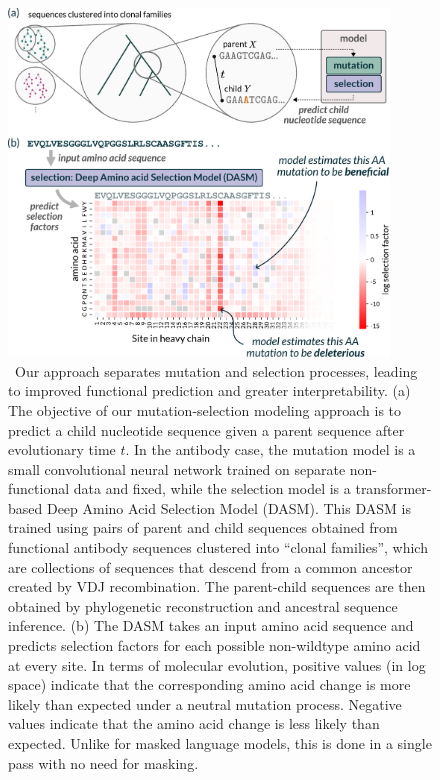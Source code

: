\documentclass{article}
\begin{document}
\begin{figure}[h!]
\centering
\centerline{\includegraphics[width=0.9\textwidth]{figures/dasm-output-schematic}}
\caption{\
Our approach separates mutation and selection processes, leading to improved functional prediction and greater interpretability.
(a) The objective of our mutation-selection modeling approach is to predict a child nucleotide sequence given a parent sequence after evolutionary time $t$. 
In the antibody case, the mutation model is a small convolutional neural network trained on separate non-functional data and fixed, while the selection model is a transformer-based Deep Amino Acid Selection Model (DASM). 
This DASM is trained using pairs of parent and child sequences obtained from functional antibody sequences clustered into ``clonal families'', which are collections of sequences that descend from a common ancestor created by VDJ recombination.
The parent-child sequences are then obtained by phylogenetic reconstruction and ancestral sequence inference.
(b) The DASM takes an input amino acid sequence and predicts selection factors for each possible non-wildtype amino acid at every site. 
In terms of molecular evolution, positive values (in log space) indicate that the corresponding amino acid change is more likely than expected under a neutral mutation process. 
Negative values indicate that the amino acid change is less likely than expected. 
Unlike for masked language models, this is done in a single pass with no need for masking.
}%
\label{fig:methods}
\end{figure}
\end{document}
